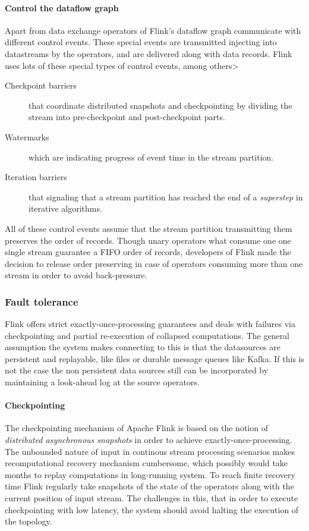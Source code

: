 \paragraph{Control the dataflow graph}
Apart from data exchange operators of Flink's dataflow graph communicate with different control events. These special events are transmitted injecting into datastreams by the operators, and are delivered along with data records. Flink uses lots of these special types of control events, among others>
\begin{description}
\item[Checkpoint barriers]that coordinate distributed snapshots and checkpointing by dividing the stream into pre-checkpoint and post-checkpoint parts.
\item[Watermarks] which are indicating progress of event time in the stream partition.
\item[Iteration barriers] that signaling that a stream partition  has reached the end of a \textit{superstep} in iterative algorithms.
\end{description}

All of these control events assume that the stream partition transmitting them preserves  the order of records.  Though unary operators what consume one  
one single stream guarantee  a FIFO order of records, developers of Flink made the decision to release order preserving in case of operators consuming more than one stream in order to avoid back-pressure.

\subsubsection{Fault tolerance}\label{flinkft}

Flink offers strict  exactly-once-processing guarantees and deals with failures  via checkpointing and partial re-execution of collapsed computations. The general assumption the system makes connecting to this is that the datasources are persistent and replayable, like files or durable message queues like Kafka. If this is not the case the non persistent data sources still can be incorporated by maintaining a look-ahead log at the source operators.

\paragraph{Checkpointing}
The checkpointing mechanism of Apache Flink is based on the notion of \textit{distributed asynchronous snapshots} in order to achieve exactly-once-processing. The unbounded nature of input in continous stream processing scenarios makes recomputational recovery mechanism cumbersome, which possibly would take months to replay computations in long-running system. 
To reach finite recovery time Flink regularly take snapshots of the state of the operators along with the current position of input stream. The challenges in this, that in order to execute checkpointing with low latency, the system should avoid halting the execution of the topology. 

